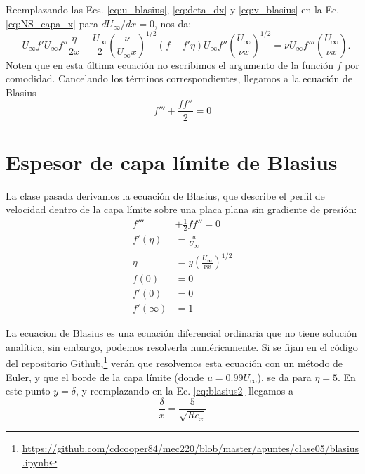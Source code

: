 Reemplazando las Ecs. \eqref{eq:u_blasius}, \eqref{eq:deta_dx} y \eqref{eq:v_blasius} en la Ec. \eqref{eq:NS_capa_x} para $dU_\infty/dx = 0$, nos da:
%
\begin{equation}
-U_\infty f'U_\infty f''\frac{\eta}{2x} - \frac{U_\infty}{2}\left(\frac{\nu}{U_\infty x}\right)^{1/2}(f-f'\eta)U_\infty f''\left(\frac{U_\infty}{\nu x}\right)^{1/2} = \nu U_\infty f'''\left(\frac{U_\infty}{\nu x}\right).
\end{equation}
%
Noten que en esta última ecuación no escribimos el argumento de la función $f$ por comodidad.
Cancelando los términos correspondientes, llegamos a la ecuación de Blasius
%
\begin{equation}
f'''+\frac{ff''}{2}=0
\end{equation}

\section*{Espesor de capa límite de Blasius}

 La clase pasada derivamos la ecuación de Blasius, que describe el perfil de velocidad dentro de la capa límite sobre una placa plana sin gradiente de presión:
 \begin{align}\label{eq:blasius2}
f'''&+\frac{1}{2}ff''=0\nonumber\\
f'(\eta) &= \frac{u}{U_\infty} \nonumber\\
\eta &= y\left(\frac{U_\infty}{\nu x}\right)^{1/2}\nonumber\\
f(0) &= 0\nonumber\\
f'(0) &= 0\nonumber\\
f'(\infty) &= 1
 \end{align}

 La ecuacion de Blasius es una ecuación diferencial ordinaria que no tiene solución analítica, sin embargo, podemos resolverla numéricamente.
 Si se fijan en el código del repositorio Github,\footnote{\url{https://github.com/cdcooper84/mec220/blob/master/apuntes/clase05/blasius.ipynb}} verán  que resolvemos esta ecuación con un método de Euler, y que el borde de la capa límite (donde $u=0.99U_\infty$), se da para $\eta=5$.
En este punto $y=\delta$, y reemplazando en la Ec. \eqref{eq:blasius2} llegamos a
%
\begin{equation}\label{eq:delta_blasius}
\frac{\delta}{x} = \frac{5}{\sqrt{Re_x}}
\end{equation}

